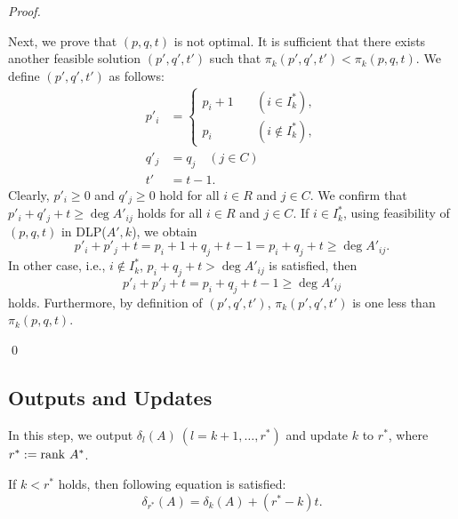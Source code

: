 \begin{proof}
\begin{enumerate}
\hspace{1zw}
Next, we prove that $ (p,q,t) $ is not optimal. 
It is sufficient that there exists another feasible solution $ (p',q',t') $ 
such that $ \pi_k ( p',q',t') < \pi_k ( p,q,t) $.  
We define $ (p',q',t') $ as follows:
\begin{align*}
p'_i &= \begin{cases} p_i + 1 \quad & ( i \in I^{\ast}_k), \\ p_i & ( i \notin I^{\ast}_k), \end{cases}\\
q'_j &= q_j \quad ( j\in C) \\
t'   &= t - 1.
\end{align*}
Clearly, $ p'_i \ge 0 $ and $ q'_j \ge 0 $ hold for all $ i \in R $ and $ j \in C $. 
We confirm that $ p'_i + q'_j + t \ge \deg A'_{ij} $ holds for all $ i \in R $ and $ j \in C $.
If $ i \in I_k^{\ast} $, using feasibility of $(p,q,t) $ in DLP($A',k$), we obtain
\[ p'_i + p'_j + t = p_i + 1 + q_j + t - 1 = p_i + q_j + t \ge \deg A'_{ij}. \]
In other case, i.e., $ i \notin I_k^{\ast} $, $ p_i + q_j + t > \deg A'_{ij} $ is satisfied, then
\[ p'_i + p'_j + t = p_i + q_j + t - 1 \ge \deg A'_{ij} \]
holds.
Furthermore, by definition of $ (p',q',t')$, $ \pi_k ( p',q',t') $ is one less than $ \pi_k ( p,q,t)$.
\end{enumerate} \qed
\end{proof}

\subsection{Outputs and Updates}
\label{ou}
In this step, we output $ \delta_l (A) \ ( l = k+1,\dots, r^{\ast})$ and 
update $ k$ to $ r^{\ast}$, where $ r^{\ast} := \mathrm{rank} \  A^{\ast}$. 

\begin{lemma}
If $ k < r^{\ast} $ holds, then following equation is satisfied:
\begin{equation}
\delta_{r^{\ast}} (A) = \delta_k (A) + ( r^{\ast} - k ) t.
\end{equation}
\label{lemrs}
\end{lemma}

